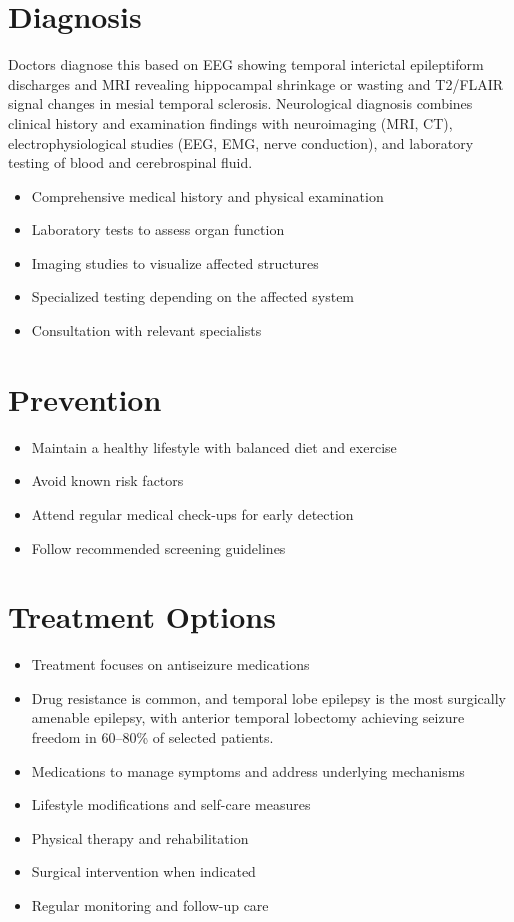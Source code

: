 \section{Diagnosis}
Doctors diagnose this based on EEG showing temporal interictal epileptiform discharges and MRI revealing hippocampal shrinkage or wasting and T2/FLAIR signal changes in mesial temporal sclerosis. Neurological diagnosis combines clinical history and examination findings with neuroimaging (MRI, CT), electrophysiological studies (EEG, EMG, nerve conduction), and laboratory testing of blood and cerebrospinal fluid.

\begin{itemize}[noitemsep]
  \item Comprehensive medical history and physical examination
  \item Laboratory tests to assess organ function
  \item Imaging studies to visualize affected structures
  \item Specialized testing depending on the affected system
  \item Consultation with relevant specialists
\end{itemize}
\section{Prevention}
\begin{itemize}[noitemsep]
  \item Maintain a healthy lifestyle with balanced diet and exercise
  \item Avoid known risk factors
  \item Attend regular medical check-ups for early detection
  \item Follow recommended screening guidelines
\end{itemize}
\section{Treatment Options}
\begin{itemize}[noitemsep]
  \item Treatment focuses on antiseizure medications
  \item Drug resistance is common, and temporal lobe epilepsy is the most surgically amenable epilepsy, with anterior temporal lobectomy achieving seizure freedom in 60--80\% of selected patients.
  \item Medications to manage symptoms and address underlying mechanisms
  \item Lifestyle modifications and self-care measures
  \item Physical therapy and rehabilitation
  \item Surgical intervention when indicated
  \item Regular monitoring and follow-up care
\end{itemize}

